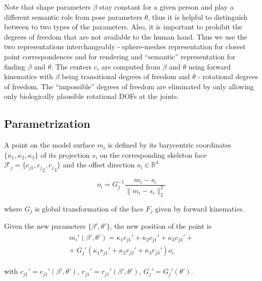 Note that shape parameters $\beta$ stay constant for a given person and play a different semantic role from pose parameters $\theta$, thus it is helpful to distinguish between to two types of the parameters. Also, it is important to prohibit the degrees of freedom that are not available to the human hand. Thus we use the two representations interchangeably - sphere-meshes representation for closest point correspondences and for rendering and ``semantic'' representation for finding $\beta$ and $\theta$.
The centers $c_i$ are computed from $\beta$ and $\theta$ using forward kinematics with $\beta$ being transitional degrees of freedom and $\theta$ - rotational degrees of freedom. The ``impossible'' degrees of freedom are eliminated by only allowing only biologically plausible rotational DOFs at the joints.

\subsection {Parametrization}

A point on the model surface $m_i$ is defined by its barycentric coordinates $\{\kappa_1, \kappa_2, \kappa_3\} $ of its projection $s_i$ on the corresponding skeleton face $\mathcal{F}_j = \{c_{j1}, {c_j}_2, {c_j}_3\}$ and the offset direction $o_i \in \mathbb{R}^3$

\begin{equation}
o_i = G_j^{-1} \frac{m_i - s_i} {\| m_i - s_i \|_2^2}
\end{equation}

where $G_j$ is global transformation of the face $F_j$ given by forward kinematics.

Given the new parameters $\{ \beta', \theta' \}$, the new position of the point is
\begin{align}
\begin{split}
m_i'(\beta', \theta') = \kappa_1 c_{j1}' + \kappa_2 c_{j1}' + \kappa_3 c_{j3}' + \\
 + \;  G_j'(\kappa_1 r_{j1}' + \kappa_2 r_{j2}' + \kappa_3 r_{j3}') o_i
\end{split}
\end{align}

with $c_{j1}' = c_{j1}'(\beta', \theta')$,  $r_{j1}' = r_{j1}'(\beta', \theta')$, $G_j' =G_j'(\theta')$.